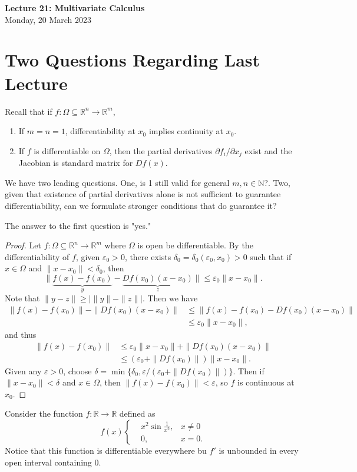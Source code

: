 \documentclass[11pt]{article}
\theoremstyle{definition}
\newcommand{\R}{\mathbb{R}}                      %
\newcommand{\N}{\mathbb{N}}
\begin{document}
\thispagestyle{empty}

\begin{center}
{\LARGE \bf Lecture 21: Multivariate Calculus}\\
{\large Monday, 20 March 2023}\\
\end{center}
\section{Two Questions Regarding Last Lecture}
 Recall that if $f:\Omega\subseteq \R^n\to\R^m$,
 \begin{enumerate}
     \item If $m=n=1$, differentiability at $x_0$ implies continuity at $x_0$.
     \item If $f$ is differentiable on $\Omega$, then the partial derivatives $\partial f_i/\partial x_j$ exist and the Jacobian is standard matrix for $Df(x)$.
 \end{enumerate}
We have two leading questions. One, is 1 still valid for general $m,n\in\N$?. Two, given that existence of partial derivatives alone is not sufficient to guarantee differentiability, can we formulate stronger conditions that do guarantee it?

\prop The answer to the first question is "yes."

\begin{proof}
    Let $f:\Omega\subseteq\R^n\to\R^m$ where $\Omega$ is open be differentiable. By the differentiability of $f$, given $\varepsilon_0>0$, there exists $\delta_0=\delta_0(\varepsilon_0,x_0)>0$ such that if $x\in\Omega$ and $\|x-x_0\|<\delta_0$, then 
    $$
    \|\underbrace{f(x)-f(x_0)}_y-\underbrace{Df(x_0)(x-x_0)}_z\|\leq \varepsilon_0\|x-x_0\|.
    $$
    Note that $\|y-z\|\geq |\|y\|-\|z\||$. Then we have
    \begin{align*}
        \|f(x)-f(x_0)\|-\|Df(x_0)(x-x_0)\|&\leq\|f(x)-f(x_0)-Df(x_0)(x-x_0)\|\\
        &\leq \varepsilon_0\|x-x_0\|,
    \end{align*}
    and thus
    \begin{align*}
        \|f(x)-f(x_0)\|&\leq \varepsilon_0\|x-x_0\|+\|Df(x_0)(x-x_0)\|\\
        &\leq (\varepsilon_0+\|Df(x_0)\|)\|x-x_0\|.
    \end{align*}
    Given any $\varepsilon>0$, choose $\delta=\min\{\delta_0,\varepsilon/(\varepsilon_0+\|Df(x_0)\|)\}$. Then if $\|x-x_0\|<\delta$ and $x\in\Omega$, then $\|f(x)-f(x_0)\|<\varepsilon$, so $f$ is continuous at $x_0$.
\end{proof}
\ex Consider the function $f:\R\to\R$ defined as
$$
f(x)\left\{\begin{aligned}
&x^2\sin{\frac{1}{x^2}},&x\neq0\\
&0,&x=0.
\end{aligned}\right.
$$
Notice that this function is differentiable everywhere bu $f'$ is unbounded in every open interval containing 0.
\end{document}
